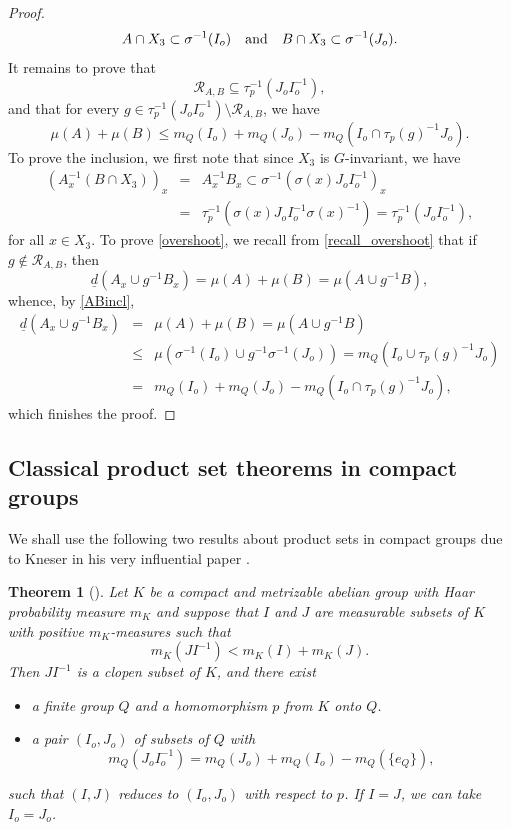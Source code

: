 \documentclass[JEP,XML,SOM,Unicode]{cedram}
\let\mathcal\mathscr
\newcommand{\cR}{\mathcal{R}}
\newcommand{\qand}{\quad\textup{and}\quad}
\theoremstyle{plain}
\newtheorem{theorem}{Theorem}[section]
\theoremstyle{definition}
\begin{document}
\begin{proof}
\begin{equation}
\label{ABincl}
A \cap X_3 \subset \sigma^{-1}(I_o) \qand B \cap X_3 \subset \sigma^{-1}(J_o).
\end{equation}
It remains to prove that
\[
\cR_{A,B} \subseteq \tau_p^{-1}(J_o I_o^{-1}),
\]
and that for every $g \in \tau_p^{-1}(J_o I_o^{-1}) \setminus \cR_{A,B}$, we have
\begin{equation}
\label{overshoot}
\mu(A) + \mu(B) \leq m_Q(I_o) + m_Q(J_o) - m_Q(I_o \cap \tau_p(g)^{-1}J_o).
\end{equation}
To prove the inclusion, we first note that since $X_3$ is $G$-invariant, we have
\begin{eqnarray*}
(A_x^{-1}(B \cap X_3))_x
&=&
A_x^{-1} B_x \subset \sigma^{-1}(\sigma(x)J_o I_o^{-1})_x \\
&=& \tau_p^{-1}(\sigma(x)J_o I_o^{-1}\sigma(x)^{-1}) = \tau_p^{-1}(J_o I_o^{-1}),
\end{eqnarray*}
for all $x \in X_3$. To prove \eqref{overshoot}, we recall from \eqref{recall_overshoot} that if $g \notin \cR_{A,B}$, then
\[
\underline{d}(A_x \cup g^{-1}B_x)
= \mu(A) + \mu(B) = \mu(A \cup g^{-1}B),
\]
whence, by \eqref{ABincl},
\begin{eqnarray*}
\underline{d}(A_x \cup g^{-1}B_x)
&=& \mu(A) + \mu(B) = \mu(A \cup g^{-1}B) \\
&\leq &
\mu(\sigma^{-1}(I_o) \cup g^{-1} \sigma^{-1}(J_o))
=
m_Q(I_o \cup \tau_p(g)^{-1}J_o) \\
&=&
m_Q(I_o) + m_Q(J_o) - m_Q(I_o \cap \tau_p(g)^{-1}J_o),
\end{eqnarray*}
which finishes the proof.
\end{proof}

\subsection{Classical product set theorems in compact groups}

We shall use the following two results about product sets in compact groups due to Kneser in his very influential paper \cite{Kneser}.

\begin{theorem}[{\cite[Satz\,1]{Kneser}}]
\label{thm_Kneser1}
Let $K$ be a compact and metrizable abelian group with Haar probability measure $m_K$ and suppose that $I$ and $J$ are measurable subsets of $K$
with positive $m_K$-measures such that
\[
m_K(JI^{-1}) < m_K(I) + m_K(J).
\]
Then $JI^{-1}$ is a clopen subset of $K$, and there exist

\begin{itemize}
\item a finite group $Q$ and a homomorphism $p$ from $K$ onto $Q$.
\item a pair $(I_o,J_o)$ of subsets of $Q$ with
\[
m_Q(J_o I_o^{-1}) = m_Q(J_o) + m_Q(I_o) - m_Q(\{e_Q\}),
\]
\end{itemize}
such that $(I,J)$ reduces to $(I_o,J_o)$ with respect to $p$. If $I = J$, we can take $I_o = J_o$.
\end{theorem}
\end{document}
